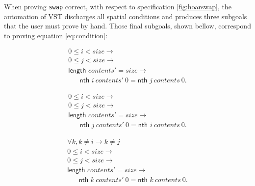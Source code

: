 \documentclass[onecolumn, preprint]{sigplanconf}
\newcommand{\nth}[3]{\textsf{nth } #1\ #2\ #3}
\begin{document}

When proving \texttt{swap} correct, with respect to specification \ref{fig:hoarswap}, the automation of VST discharges all spatial conditions and produces three subgoals that the user must prove by hand. Those final subgoals, shown bellow, correspond to proving equation \ref{eq:condition}:

\begin{equation}
\label{eq:sub1}
\begin{aligned}
&0 \leq i < size \rightarrow &\\
&0 \leq j < size \rightarrow &\\
&\textsf{length } contents' = size \rightarrow &\\
& \hspace{20pt} \nth{i}{contents'}{0} = \nth{j}{contents}{0}.
\end{aligned}
\end{equation}

\begin{equation}
\label{eq:sub2}
\begin{aligned}
&0 \leq i < size \rightarrow &\\
&0 \leq j < size \rightarrow &\\
&\textsf{length } contents' = size \rightarrow &\\
& \hspace{20pt} \nth{j}{contents'}{0} = \nth{i}{contents}{0}.
\end{aligned}
\end{equation}

\begin{equation}
\label{eq:sub3}
\begin{aligned}
&\forall k, k\not = i \rightarrow k\not =j & \\
&0 \leq i < size \rightarrow &\\
&0 \leq j < size \rightarrow &\\
&\textsf{length } contents' = size \rightarrow &\\
& \hspace{20pt} \nth{k}{contents'}{0} = \nth{k}{contents}{0}.
\end{aligned}
\end{equation}
\end{document}
